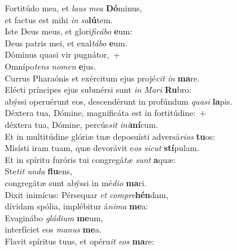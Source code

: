\evenverse Fortitúdo mea, et \textit{laus} \textit{me}\textit{a} \textbf{Dó}minus,~\*\\
\evenverse et factus est mihi \textit{in} \textit{sa}\textbf{lú}tem.\\
\oddverse Iste Deus meus, et glori\textit{fi}\textit{cá}\textit{bo} \textbf{e}um:~\*\\
\oddverse Deus patris mei, et exal\textit{tá}\textit{bo} \textbf{e}um.\\
\evenverse Dóminus quasi vir pugnátor,~+\\
\evenverse  Omnípo\textit{tens} \textit{no}\textit{men} \textbf{e}jus.~\*\\
\evenverse Currus Pharaónis et exércitum ejus projé\textit{cit} \textit{in} \textbf{ma}re.\\
\oddverse Elécti príncipes ejus submérsi sunt \textit{in} \textit{Ma}\textit{ri} \textbf{Ru}bro:~\*\\
\oddverse abýssi operuérunt eos, descendérunt in profúndum \textit{qua}\textit{si} \textbf{la}pis.\\
\evenverse Déxtera tua, Dómine, magnificáta est in fortitúdine:~+\\
\evenverse  déxtera tua, Dómine, percús\textit{sit} \textit{i}\textit{ni}\textbf{mí}cum.~\*\\
\evenverse Et in multitúdine glóriæ tuæ deposuísti adversá\textit{ri}\textit{os} \textbf{tu}os:\\
\oddverse Misísti iram tuam, quæ devorávit e\textit{os} \textit{si}\textit{cut} \textbf{stí}pulam.~\*\\
\oddverse Et in spíritu furóris tui congregá\textit{tæ} \textit{sunt} \textbf{a}quæ:\\
\evenverse Ste\textit{tit} \textit{un}\textit{da} \textbf{flu}ens,~\*\\
\evenverse congregátæ sunt abýssi in mé\textit{di}\textit{o} \textbf{ma}ri.\\
\oddverse Dixit inimícus: Pérsequar \textit{et} \textit{com}\textit{pre}\textbf{hén}dam,~\*\\
\oddverse dívidam spólia, implébitur á\textit{ni}\textit{ma} \textbf{me}a:\\
\evenverse Evaginábo \textit{glá}\textit{di}\textit{um} \textbf{me}um,~\*\\
\evenverse interfíciet eos \textit{ma}\textit{nus} \textbf{me}a.\\
\oddverse Flavit spíritus tuus, et opéru\textit{it} \textit{e}\textit{os} \textbf{ma}re:~\*\\
